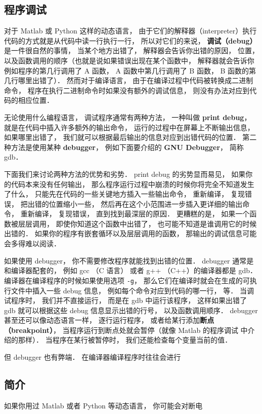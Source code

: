 
\subsection{程序调试}

对于 Matlab 或 Python 这样的动态语言， 由于它们的解释器（interpreter）执行代码的方式就是从代码中读一行执行一行， 所以对它们的来说， \textbf{调试（debug）}是一件很自然的事情， 当某个地方出错了， 解释器会告诉你出错的原因， 位置， 以及函数调用的顺序（也就是说如果错误出现在某个函数中， 解释器就会告诉你例如程序的第几行调用了 A 函数， A 函数中第几行调用了 B 函数， B 函数的第几行哪里出错了）． 然而对于编译语言， 由于在编译过程中代码被转换成二进制命令， 程序在执行二进制命令时如果没有额外的调试信息， 则没有办法对应到代码的相应位置．

无论使用什么编程语言， 调试程序通常有两种方法， 一种叫做 \textbf{print debug}， 就是在代码中插入许多额外的输出命令， 运行的过程中在屏幕上不断输出信息， 如果哪里出错了， 我们就可以根据最后输出的信息对应到出错代码的位置． 第二种方法是使用某种 \textbf{debugger}， 例如下面要介绍的 \textbf{GNU Debugger}， 简称 gdb．

下面我们来讨论两种方法的优势和劣势． print debug 的劣势显而易见， 如果你的代码本来没有任何输出， 那么程序运行过程中崩溃的时候你将完全不知道发生了什么， 只能先在代码的一些关键地方插入一些输出命令， 重新编译， 复现错误， 把出错的位置缩小一些， 然后再在这个小范围进一步插入更详细的输出命令， 重新编译， 复现错误， 直到找到最深层的原因． 更糟糕的是， 如果一个函数被层层调用， 即使你知道这个函数中出错了， 也可能不知道是谁调用它的时候出错的． 如果你的程序有嵌套循环以及层层调用的函数， 那输出的调试信息可能会多得难以阅读．

如果使用 debugger， 你不需要修改程序就能找到出错的位置． debugger 通常是和编译器配套的， 例如 gcc （C 语言） 或者 g++ （C++）的编译器都是 gdb． 编译器在编译程序的时候如果使用选项 \verb|-g|， 那么它们在编译时就会在生成的可执行文件中插入一些 debug 信息， 例如每个命令对应到代码的哪一行， 等． 当调试程序时， 我们并不直接运行， 而是在 gdb 中运行该程序， 这样如果出错了 gdb 就可以根据这些 debug 信息显示出错的行号， 以及函数调用顺序． debugger 甚至还可以像动态语言一样， 逐行运行程序， 或者给某行添加\textbf{断点（breakpoint）}， 当程序运行到断点处就会暂停（就像 Matlab 的程序调试 中介绍的那样）． 当程序在某行被暂停时， 我们还能检查每个变量当前的值．

但 debugger 也有弊端． 在编译器编译程序时往往会进行

\subsection{简介}
如果你用过 Matlab 或者 Python 等动态语言， 你可能会对断电
